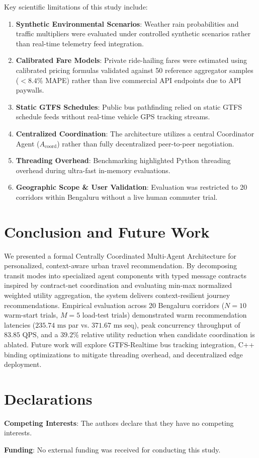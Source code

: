 \documentclass[runningheads]{llncs}
\begin{document}
Key scientific limitations of this study include:
\begin{enumerate}
    \item \textbf{Synthetic Environmental Scenarios}: Weather rain probabilities and traffic multipliers were evaluated under controlled synthetic scenarios rather than real-time telemetry feed integration.
    \item \textbf{Calibrated Fare Models}: Private ride-hailing fares were estimated using calibrated pricing formulas validated against 50 reference aggregator samples ($<8.4\%$ MAPE) rather than live commercial API endpoints due to API paywalls.
    \item \textbf{Static GTFS Schedules}: Public bus pathfinding relied on static GTFS schedule feeds without real-time vehicle GPS tracking streams.
    \item \textbf{Centralized Coordination}: The architecture utilizes a central Coordinator Agent ($A_{\text{coord}}$) rather than fully decentralized peer-to-peer negotiation.
    \item \textbf{Threading Overhead}: Benchmarking highlighted Python threading overhead during ultra-fast in-memory evaluations.
    \item \textbf{Geographic Scope \& User Validation}: Evaluation was restricted to 20 corridors within Bengaluru without a live human commuter trial.
\end{enumerate}


\section{Conclusion and Future Work}
\label{sec:conclusion}

We presented a formal Centrally Coordinated Multi-Agent Architecture for personalized, context-aware urban travel recommendation. By decomposing transit modes into specialized agent components with typed message contracts inspired by contract-net coordination and evaluating min-max normalized weighted utility aggregation, the system delivers context-resilient journey recommendations. Empirical evaluation across 20 Bengaluru corridors ($N=10$ warm-start trials, $M=5$ load-test trials) demonstrated warm recommendation latencies ($235.74\text{ ms}$ par vs. $371.67\text{ ms}$ seq), peak concurrency throughput of $83.85\text{ QPS}$, and a $39.2\%$ relative utility reduction when candidate coordination is ablated. Future work will explore GTFS-Realtime bus tracking integration, C++ binding optimizations to mitigate threading overhead, and decentralized edge deployment.


\section*{Declarations}
\textbf{Competing Interests}: The authors declare that they have no competing interests.

\textbf{Funding}: No external funding was received for conducting this study.




\end{document}
